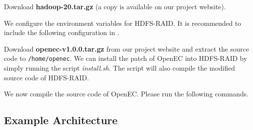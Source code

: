 \documentclass[letterpaper,12pt]{article}
\newcommand{\openec}{{\sf\small OpenEC}\xspace}
\begin{document}
Download {\bf hadoop-20.tar.gz} (a copy is available on our project website).

\begin{center}
\noindent{}
\end{center}

We configure the environment variables for HDFS-RAID. It is recommended to
include the following configuration in .

\begin{center}
\noindent{}
\end{center}

Download {\bf openec-v1.0.0.tar.gz} from our project website and extract the
source code to {\tt /home/openec}.  We can install the patch of \openec into
HDFS-RAID by simply running the script {\sl install.sh}.  The script will also
compile the modified source code of HDFS-RAID.

\begin{center}
\noindent{}
\end{center}

We now compile the source code of \openec. Please run the following commands.

\begin{center}
\noindent{}
\end{center}

\subsection{Example Architecture}
\end{document}
